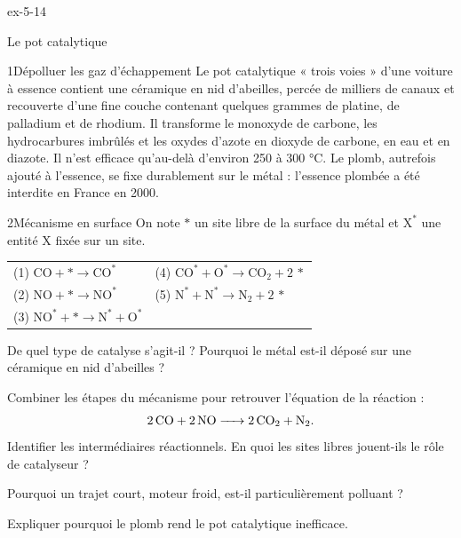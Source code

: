 \begin{blocLivre}{ex-5-14}
\begin{exercice}[3]{Le pot catalytique}
\begin{docu}{1}{Dépolluer les gaz d'échappement}
Le pot catalytique « trois voies » d'une voiture à essence contient une céramique en nid d'abeilles, percée de milliers
de canaux et recouverte d'une fine couche contenant quelques grammes de platine, de palladium et de rhodium. Il
transforme le monoxyde de carbone, les hydrocarbures imbrûlés et les oxydes d'azote en dioxyde de carbone, en eau et
en diazote. Il n'est efficace qu'au-delà d'environ 250 à 300 °C. Le plomb, autrefois ajouté à l'essence, se fixe
durablement sur le métal : l'essence plombée a été interdite en France en 2000.
\end{docu}
\begin{docu}{2}{Mécanisme en surface}
On note $\ast$ un site libre de la surface du métal et $\mathrm{X}^{\ast}$ une entité X fixée sur un site.
\par\smallskip
{\renewcommand{\arraystretch}{1.25}%
\begin{tabular}{@{}l@{\hspace{10mm}}l@{}}
(1) $\mathrm{CO}+\ast\longrightarrow\mathrm{CO}^{\ast}$ & (4) $\mathrm{CO}^{\ast}+\mathrm{O}^{\ast}\longrightarrow\mathrm{CO_2}+2\,\ast$\\
(2) $\mathrm{NO}+\ast\longrightarrow\mathrm{NO}^{\ast}$ & (5) $\mathrm{N}^{\ast}+\mathrm{N}^{\ast}\longrightarrow\mathrm{N_2}+2\,\ast$\\
(3) $\mathrm{NO}^{\ast}+\ast\longrightarrow\mathrm{N}^{\ast}+\mathrm{O}^{\ast}$ &
\end{tabular}}
\end{docu}
\begin{questions}
\item De quel type de catalyse s'agit-il ? Pourquoi le métal est-il déposé sur une céramique en nid d'abeilles ?
\item \initiative Combiner les étapes du mécanisme pour retrouver l'équation de la réaction :
\[\ce{2 CO + 2 NO -> 2 CO2 + N2}.\]
Identifier les intermédiaires réactionnels. En quoi les sites libres jouent-ils le rôle de catalyseur ?
\item Pourquoi un trajet court, moteur froid, est-il particulièrement polluant ?
\item Expliquer pourquoi le plomb rend le pot catalytique inefficace.
\end{questions}
\end{exercice}
\end{blocLivre}
